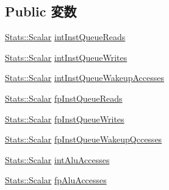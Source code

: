 \subsection*{Public 変数}
\begin{DoxyCompactItemize}
\item 
\hyperlink{classStats_1_1Scalar}{Stats::Scalar} \hyperlink{classInstructionQueue_a80520cf10aa5e634d9e3fb6cdc0aef2f}{intInstQueueReads}
\item 
\hyperlink{classStats_1_1Scalar}{Stats::Scalar} \hyperlink{classInstructionQueue_a095bbdf62a50bf39e824e7187cde5191}{intInstQueueWrites}
\item 
\hyperlink{classStats_1_1Scalar}{Stats::Scalar} \hyperlink{classInstructionQueue_afd00a0a956c7aeab072e57a3927ee148}{intInstQueueWakeupAccesses}
\item 
\hyperlink{classStats_1_1Scalar}{Stats::Scalar} \hyperlink{classInstructionQueue_ac72607fe25b1d8aefd4ca2dda8533bb2}{fpInstQueueReads}
\item 
\hyperlink{classStats_1_1Scalar}{Stats::Scalar} \hyperlink{classInstructionQueue_a462728858d9c7392da1a4e3695a10c3c}{fpInstQueueWrites}
\item 
\hyperlink{classStats_1_1Scalar}{Stats::Scalar} \hyperlink{classInstructionQueue_a666c1c2a3552ee13d2f8185434c9552b}{fpInstQueueWakeupQccesses}
\item 
\hyperlink{classStats_1_1Scalar}{Stats::Scalar} \hyperlink{classInstructionQueue_aec28ae6ca74e00e9b5eb0bd8bb9e1176}{intAluAccesses}
\item 
\hyperlink{classStats_1_1Scalar}{Stats::Scalar} \hyperlink{classInstructionQueue_a1dd5fc6a847750f4294e41e801b47bf4}{fpAluAccesses}
\end{DoxyCompactItemize}
